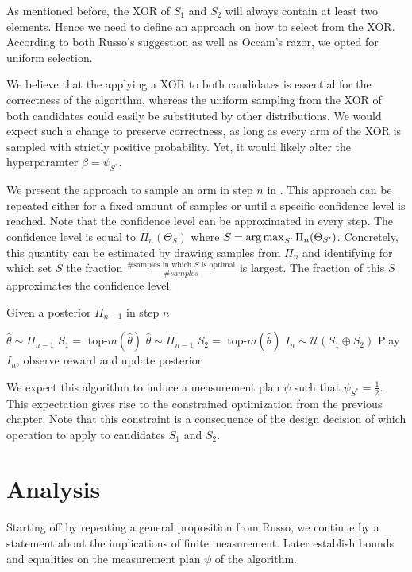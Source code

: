 As mentioned before, the XOR of $S_1$ and $S_2$ will always contain at least two
elements. Hence we need to define an approach on how to select from the XOR.
According to both Russo's suggestion as well as Occam's razor, we opted for
uniform selection.

We believe that the applying a XOR to both candidates is essential for the
correctness of the algorithm, whereas the uniform sampling from the XOR of both
candidates could easily be substituted by other distributions. We would expect
such a change to preserve correctness, as long as every arm of the XOR is
sampled with strictly positive probability. Yet, it would likely alter the
hyperparamter $\beta = \psi_{S^*}$.

We present the approach to sample an arm in step $n$ in .
This approach can be repeated either for a fixed amount of samples or until a
specific confidence level is reached. Note that the confidence level can be
approximated in every step. The confidence level is equal to $\Pi_n(\Theta_S)$
where $S = \operatorname*{arg\,max}_{S'} \Pi_n(\Theta_{S'})$. Concretely, this quantity can be
estimated by drawing samples from $\Pi_n$ and identifying for which set $S$ the
fraction $\frac{\text{\# samples in which $S$ is optimal}}{\#samples}$ is
largest. The fraction of this $S$ approximates the confidence level.
\begin{algorithm}[H]
  \caption{Given a posterior $\Pi_{n-1}$ in step $n$}
  \label{alg:TXTS}
  \begin{algorithmic}
    \State $\hat{\theta} \sim \Pi_{n-1}$
    \State $S_1 =$ top-$m(\hat{\theta})$
    \Repeat
      \State $\hat{\theta} \sim \Pi_{n-1}$
      \State $S_2 = $ top-$m(\hat{\theta})$
    \State $I_n \sim \mathcal{U}(S_1 \oplus S_2)$
    \State Play $I_n$, observe reward and update posterior
  \end{algorithmic}
\end{algorithm}
We expect this algorithm to induce a measurement plan $\psi$ such that
$\psi_{S^*} = \frac{1}{2}$. This expectation gives rise to the constrained
optimization from the previous chapter. Note that this constraint is a
consequence of the design decision of which operation to apply to candidates
$S_1$ and $S_2$.

\section{Analysis}\label{section:analysis}
Starting off by repeating a general proposition from Russo, we continue by a statement about the implications of finite measurement. Later establish bounds and equalities on the measurement plan $\psi$ of the
algorithm.

